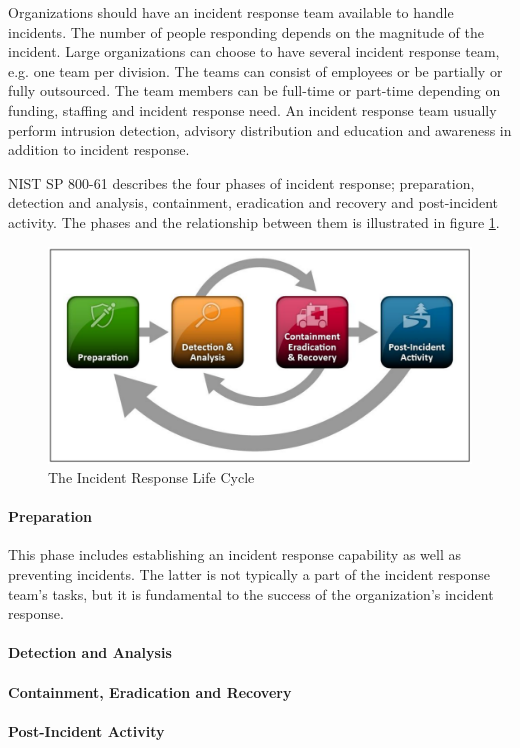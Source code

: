 Organizations should have an incident response team available to handle incidents. The number of people responding depends on the magnitude of the incident. Large organizations can choose to have several incident response team, e.g. one team per division. The teams can consist of employees or be partially or fully outsourced. The team members can be full-time or part-time depending on funding, staffing and incident response need.  %
An incident response team usually perform intrusion detection, advisory distribution and education and awareness in addition to incident response.

\acs{NIST} SP 800-61 describes the four phases of incident response; preparation, detection and analysis, containment, eradication and recovery and post-incident activity. The phases and the relationship between them is illustrated in figure \ref{fig:NISTIncidentResponse}.

\begin{figure}[H]
\begin{center}
\includegraphics[scale=0.27]{NISTIncidentResponseCycle.png}
\caption[The Incident Response Life Cycle]{The Incident Response Life Cycle \cite{nist800-61}}
\label{fig:NISTIncidentResponse}
\end{center}
\end{figure}

\paragraph{Preparation} This phase includes establishing an incident response capability as well as preventing incidents. The latter is not typically a part of the incident response team's tasks, but it is fundamental to the success of the organization's incident response.

\paragraph{Detection and Analysis}

\paragraph{Containment, Eradication and Recovery}

\paragraph{Post-Incident Activity}



